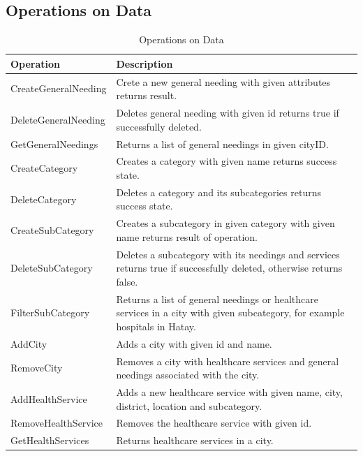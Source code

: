 \subsection{Operations on Data}
\begin{table}[H]
    \begin{tabular}{|p{6cm}|p{10cm}|}
        \hline
        \textbf{Operation}   & \textbf{Description}                                                                                                                                    \\
        \hline
        \hline
        CreateGeneralNeeding & Crete a new general needing with given attributes returns result.                                                                                                       \\
        \hline
        DeleteGeneralNeeding                & Deletes general needing with given id returns true if successfully deleted.                                                                                                        \\
        \hline
        GetGeneralNeedings                  & Returns a list of general needings in given cityID. \\
        \hline
        CreateCategory                & Creates a category with given name returns success state.                                                                                   \\
        \hline
        DeleteCategory          & Deletes a category and its subcategories returns success state.\\
        \hline
        CreateSubCategory & Creates a subcategory in given category with given name returns result of operation.\\
        \hline
        DeleteSubCategory & Deletes a subcategory with its needings and services returns true if successfully deleted, otherwise returns false.\\
        \hline
        FilterSubCategory & Returns a list of general needings or healthcare services in a city with given subcategory, for example hospitals in Hatay.\\
        \hline
        AddCity & Adds a city with given id and name.\\
        \hline
        RemoveCity & Removes a city with healthcare services and general needings associated with the city.\\
        \hline
        AddHealthService & Adds a new healthcare service with given name, city, district, location and subcategory.\\
        \hline
        RemoveHealthService & Removes the healthcare service with given id.\\
        \hline
        GetHealthServices & Returns healthcare services in a city.\\
        \hline
    \end{tabular}
    \caption[Operations on Data]{Operations on Data}
\end{table}


